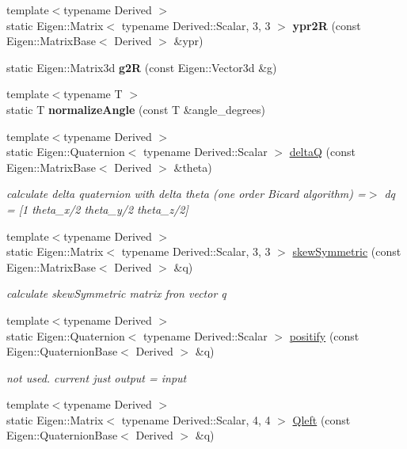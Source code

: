 \begin{DoxyCompactItemize}
{\footnotesize template$<$typename Derived $>$ }\\static Eigen\+::\+Matrix$<$ typename Derived\+::\+Scalar, 3, 3 $>$ {\bfseries ypr2R} (const Eigen\+::\+Matrix\+Base$<$ Derived $>$ \&ypr)
\item 
\mbox{\label{classUtility_a93df577f51e519fd9e9f931b27b3d4ac}} 
static Eigen\+::\+Matrix3d {\bfseries g2R} (const Eigen\+::\+Vector3d \&g)
\item 
\mbox{\label{classUtility_af36ac46f69e5f6ecf45b9ea471e73cb1}} 
{\footnotesize template$<$typename T $>$ }\\static T {\bfseries normalize\+Angle} (const T \&angle\+\_\+degrees)
\item 
{\footnotesize template$<$typename Derived $>$ }\\static Eigen\+::\+Quaternion$<$ typename Derived\+::\+Scalar $>$ \hyperlink{classUtility_ad6db663af81d0dfb446f217a7032f28b}{deltaQ} (const Eigen\+::\+Matrix\+Base$<$ Derived $>$ \&theta)
\begin{DoxyCompactList}\small\item\em calculate delta quaternion with delta theta (one order Bicard algorithm) =$>$ dq = \mbox{[}1 theta\+\_\+x/2 theta\+\_\+y/2 theta\+\_\+z/2\mbox{]} \end{DoxyCompactList}\item 
{\footnotesize template$<$typename Derived $>$ }\\static Eigen\+::\+Matrix$<$ typename Derived\+::\+Scalar, 3, 3 $>$ \hyperlink{classUtility_af2736e24a6c1dc11e62e7cffa9e9502e}{skew\+Symmetric} (const Eigen\+::\+Matrix\+Base$<$ Derived $>$ \&q)
\begin{DoxyCompactList}\small\item\em calculate skew\+Symmetric matrix fron vector q \end{DoxyCompactList}\item 
{\footnotesize template$<$typename Derived $>$ }\\static Eigen\+::\+Quaternion$<$ typename Derived\+::\+Scalar $>$ \hyperlink{classUtility_a686a533a24f020b66342708d5bf0730c}{positify} (const Eigen\+::\+Quaternion\+Base$<$ Derived $>$ \&q)
\begin{DoxyCompactList}\small\item\em not used. current just output = input \end{DoxyCompactList}\item 
{\footnotesize template$<$typename Derived $>$ }\\static Eigen\+::\+Matrix$<$ typename Derived\+::\+Scalar, 4, 4 $>$ \hyperlink{classUtility_a1006727702d0894f4ffbd18081c080a3}{Qleft} (const Eigen\+::\+Quaternion\+Base$<$ Derived $>$ \&q)

\end{DoxyCompactItemize}
